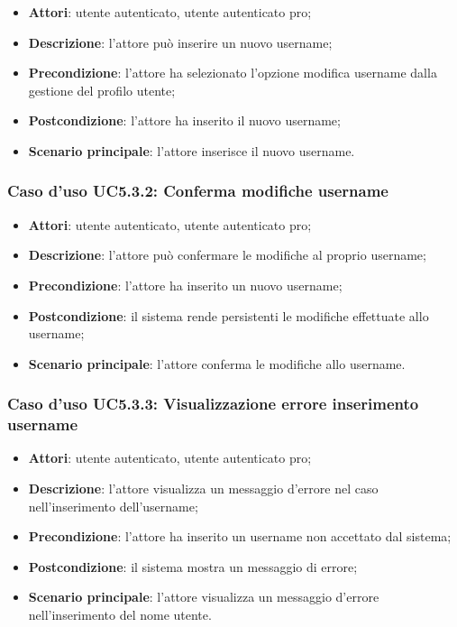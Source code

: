 \begin{itemize}
	\item \textbf{Attori}: utente autenticato, utente autenticato pro;
	\item \textbf{Descrizione}: l'attore può inserire un nuovo username;
	\item \textbf{Precondizione}: l'attore ha selezionato l'opzione modifica username dalla gestione del profilo utente; 
	\item \textbf{Postcondizione}: l'attore ha inserito il nuovo username;
	\item \textbf{Scenario principale}: l'attore inserisce il nuovo username.
\end{itemize}

\subsubsection{Caso d'uso UC5.3.2: Conferma modifiche username}

\begin{itemize}
	\item \textbf{Attori}: utente autenticato, utente autenticato pro;
	\item \textbf{Descrizione}: l'attore può confermare le modifiche al proprio username;
	\item \textbf{Precondizione}: l'attore ha inserito un nuovo username;
	\item \textbf{Postcondizione}: il sistema rende persistenti le modifiche effettuate allo username;
	\item \textbf{Scenario principale}: l'attore conferma le modifiche allo username.
\end{itemize}

\subsubsection{Caso d'uso UC5.3.3: Visualizzazione errore inserimento username}
\begin{itemize}
	\item \textbf{Attori}: utente autenticato, utente autenticato pro;
	\item \textbf{Descrizione}: l'attore visualizza un messaggio d'errore nel caso nell'inserimento dell'username;
	\item \textbf{Precondizione}: l'attore ha inserito un username non accettato dal sistema;
	\item \textbf{Postcondizione}: il sistema mostra un messaggio di errore;
	\item \textbf{Scenario principale}: l'attore visualizza un messaggio d'errore nell'inserimento del nome utente.
\end{itemize}

